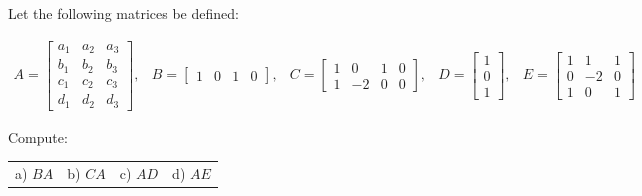 \item Let the following matrices be defined:

$$
\begin{array}{ccccc}
    A = \begin{bmatrix}
        a_1 & a_2 & a_3 \\
        b_1 & b_2 & b_3 \\
        c_1 & c_2 & c_3 \\
        d_1 & d_2 & d_3
    \end{bmatrix},
    &
    B = \begin{bmatrix}
        1 & 0 & 1 & 0
    \end{bmatrix},
    &
    C = \begin{bmatrix}
        1 & 0 & 1 & 0 \\
        1 & -2 & 0 & 0
    \end{bmatrix},
    &
    D = \begin{bmatrix}
        1 \\ 0 \\ 1
    \end{bmatrix},
    &
    E = \begin{bmatrix}
        1 & 1 & 1 \\
        0 & -2 & 0 \\
        1 & 0 & 1
    \end{bmatrix}
\end{array}
$$

Compute:

\begin{tabular}{llll}
    a) $BA$ & b) $CA$ & c) $AD$ & d) $AE$
\end{tabular} \\[0.5em]


